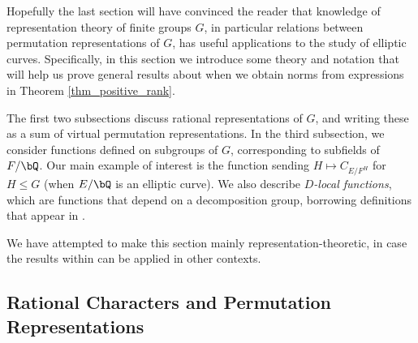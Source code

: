 Hopefully the last section will have convinced the reader that knowledge of representation theory of finite groups $G$, in particular relations between permutation representations of $G$, has useful applications to the study of elliptic curves.  Specifically, in this section we introduce some theory and notation that will  help us prove general results about when we obtain norms from expressions in Theorem \ref{thm_positive_rank}. 

The first two subsections discuss rational representations of $G$, and writing these as a sum of virtual permutation representations.
In the third subsection, we consider functions defined on subgroups of $G$, corresponding to subfields of $F / \bQ$. Our main example of interest is the function sending $H \mapsto C_{E / F^H}$ for $H \leq G$ (when $E / \bQ$ is an elliptic curve). We also describe \textit{$D$-local functions}, which are functions that depend on a decomposition group, borrowing definitions that appear in \cite[Section 2.iii]{reg-const}.

We have attempted to make this section mainly representation-theoretic, in case the results within can be applied in other contexts.

\subsection{Rational Characters and Permutation Representations}\label{rep}


